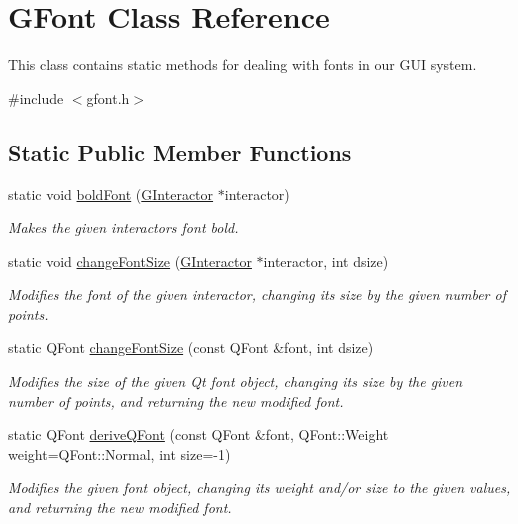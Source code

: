 \hypertarget{classGFont}{}\section{G\+Font Class Reference}
\label{classGFont}


This class contains static methods for dealing with fonts in our G\+UI system.  




{\ttfamily \#include $<$gfont.\+h$>$}

\subsection*{Static Public Member Functions}
\begin{DoxyCompactItemize}
\item 
static void \mbox{\hyperlink{classGFont_ae709c4560c613217490269d4df94602c}{bold\+Font}} (\mbox{\hyperlink{classGInteractor}{G\+Interactor}} $\ast$interactor)
\begin{DoxyCompactList}\small\item\em Makes the given interactor\textquotesingle{}s font bold. \end{DoxyCompactList}\item 
static void \mbox{\hyperlink{classGFont_ae6714d087455b3431d6dce6f1202659f}{change\+Font\+Size}} (\mbox{\hyperlink{classGInteractor}{G\+Interactor}} $\ast$interactor, int dsize)
\begin{DoxyCompactList}\small\item\em Modifies the font of the given interactor, changing its size by the given number of points. \end{DoxyCompactList}\item 
static Q\+Font \mbox{\hyperlink{classGFont_a1f55c64940d99e62528d5bfc634123f8}{change\+Font\+Size}} (const Q\+Font \&font, int dsize)
\begin{DoxyCompactList}\small\item\em Modifies the size of the given Qt font object, changing its size by the given number of points, and returning the new modified font. \end{DoxyCompactList}\item 
static Q\+Font \mbox{\hyperlink{classGFont_ac36fbf8f4ebf4558559f98d54277529f}{derive\+Q\+Font}} (const Q\+Font \&font, Q\+Font\+::\+Weight weight=Q\+Font\+::\+Normal, int size=-\/1)
\begin{DoxyCompactList}\small\item\em Modifies the given font object, changing its weight and/or size to the given values, and returning the new modified font. \end{DoxyCompactList}\item 

\end{DoxyCompactItemize}
